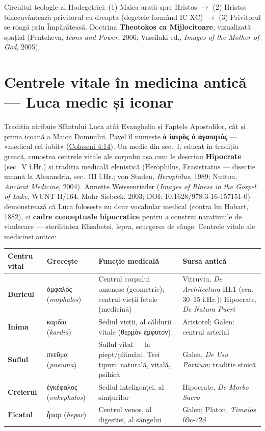 \documentclass[12pt,a4paper,twoside,openany]{book}
\begin{document}
Circuitul teologic al Hodegetriei: (1) Maica arată spre Hristos $\rightarrow$ (2) Hristos binecuvântează privitorul cu dreapta (degetele formând IC XC) $\rightarrow$ (3) Privitorul se roagă prin Împărăteasă. Doctrina \textbf{Theotokos ca Mijlocitoare}, vizualizată spațial (Pentcheva, \textit{Icons and Power}, 2006; Vassilaki ed., \textit{Images of the Mother of God}, 2005).

\section*{Centrele vitale în medicina antică --- Luca medic și iconar}

Tradiția atribuie Sfântului Luca atât Evanghelia și Faptele Apostolilor, cât și prima icoană a Maicii Domnului. Pavel îl numește \textbf{ὁ ἰατρὸς ὁ ἀγαπητός} --- «medicul cel iubit» (\href{https://bibliaortodoxa.ro/carte.php?id=10\&cap=4\#14}{Coloseni 4:14}). Un medic din sec.\ I, educat în tradiția greacă, cunoștea centrele vitale ale corpului așa cum le descriau \textbf{Hipocrate} (sec.\ V î.Hr.) și tradiția medicală elenistică (Herophilus, Erasistratus --- disecție umană la Alexandria, sec.\ III î.Hr.; von Staden, \textit{Herophilus}, 1989; Nutton, \textit{Ancient Medicine}, 2004). Annette Weissenrieder (\textit{Images of Illness in the Gospel of Luke}, WUNT II/164, Mohr Siebeck, 2003; DOI: 10.1628/978-3-16-157151-0) demonstrează că Luca folosește nu doar vocabular medical (contra lui Hobart, 1882), ci \textbf{cadre conceptuale hipocratice} pentru a construi narațiunile de vindecare --- sterilitatea Elisabetei, lepra, scurgerea de sânge. Centrele vitale ale medicinei antice:

\begin{center}
\footnotesize
\begin{tabular}{L{1.8cm}L{2.5cm}L{4.5cm}L{3.5cm}}
\toprule
{}
\textbf{Centru vital} & \textbf{Grecește} & \textbf{Funcție medicală} & \textbf{Sursa antică} \\
\midrule
\textbf{Buricul} & ὀμφαλός (\textit{omphalos}) & Centrul corpului omenesc (geometrie); centrul vieții fetale (medicină) & Vitruviu, \textit{De Architectura} III.1 (cca. 30--15 î.Hr.); Hipocrate, \textit{De Natura Pueri} \\
\textbf{Inima} & καρδία (\textit{kardia}) & Sediul vieții, al căldurii vitale (θερμὸν ἔμφυτον) & Aristotel; Galen: centrul arterial \\
\textbf{Suflul} & πνεῦμα (\textit{pneuma}) & Suflul vital --- la piept/plămâni. Trei tipuri: naturală, vitală, psihică & Galen, \textit{De Usu Partium}; tradiție stoică \\
\textbf{Creierul} & ἐγκέφαλος (\textit{enkephalos}) & Sediul inteligenței, al simțurilor & Hipocrate, \textit{De Morbo Sacro} \\
\textbf{Ficatul} & ἧπαρ (\textit{hepar}) & Centrul venos, al digestiei, al sângelui & Galen; Platon, \textit{Timaios} 69c-72d \\
\bottomrule
\end{tabular}
\end{center}
\normalsize
\end{document}
